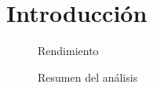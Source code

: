 \chapter{Introducción}
\label{cap:introduction}

\begin{figure}
    \centering
    
    \caption{Rendimiento}
\end{figure}

\begin{figure}
    \centering
    
    \caption{Resumen del análisis}
\end{figure}
